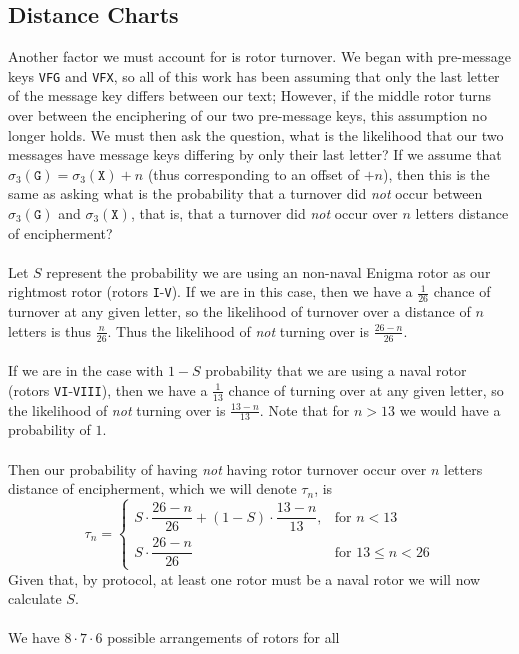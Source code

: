 \subsection{Distance Charts}\label{distance_chart}
Another factor we must account for is rotor turnover. We began with
pre-message keys \texttt{VFG} and \texttt{VFX}, so all of this work
has been assuming that only the last letter of the message key
differs between our text; However, if the middle rotor turns over
between the enciphering of our two pre-message keys, this
assumption no longer holds. We must then ask the question, what is
the likelihood that our two messages have message keys differing by
only their last letter? If we assume that $\sigma_3(\texttt{G}) =
	\sigma_3(\texttt{X}) + n$ (thus corresponding to an offset of
$+n$), then this is the same as asking what is the probability that
a turnover did \emph{not} occur between $\sigma_3(\texttt{G})$ and
$\sigma_3(\texttt{X})$, that is, that a turnover did \emph{not}
occur over $n$ letters distance of encipherment?
\\\\Let $S$ represent the probability we are using an non-naval
Enigma rotor as our rightmost rotor (rotors \texttt{I}-\texttt{V}).
If we are in this case, then we have a $\frac{1}{26}$ chance of
turnover at any given letter, so the likelihood of turnover over a
distance of $n$ letters is thus $\frac{n}{26}$. Thus the likelihood
of \emph{not} turning over is $\frac{26-n}{26}$.
\\\\If we are in the case with $1-S$ probability that we are using
a naval rotor (rotors \texttt{VI}-\texttt{VIII}), then we have a
$\frac{1}{13}$ chance of turning over at any given letter, so the
likelihood of \emph{not} turning over is $\frac{13-n}{13}$. Note
that for $n>13$ we would have a probability of $1$.
\\\\Then our probability of having \emph{not} having rotor turnover
occur over $n$ letters distance of encipherment, which we will
denote $\tau_n$, is
\[
	\tau_n =
	\begin{cases}
		S \cdot \dfrac{26 - n}{26} + (1 - S) \cdot \dfrac{13 - n}{13},
		 & \text{for } n < 13        \\
		S \cdot \dfrac{26 - n}{26}
		 & \text{for } 13 \le n < 26
	\end{cases}
\]
Given that, by protocol, at least one rotor must be a naval rotor
we will now calculate $S$.
\\\\We have $8\cdot7\cdot6$ possible arrangements of rotors for all
